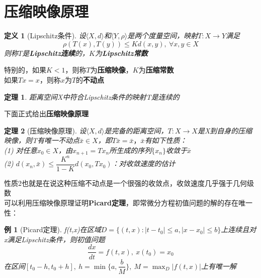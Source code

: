 \documentclass[12pt, a4paper, oneside, fontset=windows]{ctexbook}
\newtheorem{theorem}{定理}[section]
\newtheorem{definition}{定义}[section]
\newtheorem{example}{例}[section]
\begin{document}
    \section{压缩映像原理}
    \begin{definition}[Lipschitz条件]
        设$\langle X,d \rangle$和$\langle Y,\rho \rangle$是两个度量空间，映射$T:X\to Y$满足
        \[
            \rho (T(x),T(y))\le K d(x,y),\ \forall x,y\in X
        \]
        则称$T$是\textbf{Lipschitz连续}的，$K$为\textbf{Lipschitz常数}
    \end{definition}
    特别的，如果$K<1$，则称$T$为\textbf{压缩映像}，$K$为\textbf{压缩常数}\\
    如果$Tx=x$，则称$x$为$T$的\textbf{不动点}\\
    \begin{theorem}
        距离空间X中符合Lipschitz条件的映射T是连续的
    \end{theorem}
    下面正式给出{\bf 压缩映像原理}
    \begin{theorem}[压缩映像原理]
        设$\langle X,d \rangle$是完备的距离空间，$T:X\to X$是X到自身的压缩映像，则T有唯一不动点$\bar{x}\in X$，即$T\bar{x}=\bar{x}，\bar{x}$有如下性质：\\
        (1) 对任意$x_0\in X$，由$x_{n+1}=Tx_n$所生成的序列$\{x_n\}$收敛于$\bar{x}$\\
        (2) $d(x_n,\bar{x})\le \dfrac{K^n}{1-K}d(x_0,Tx_0)$：对收敛速度的估计
    \end{theorem}
    性质2也就是在说这种压缩不动点是一个很强的收敛点，收敛速度几乎强于几何级数\\
    可以利用压缩映像原理证明{\bf Picard定理}，即常微分方程初值问题的解的存在唯一性：\\
    \begin{example}[Picard定理]
        f(t,x)在区域$D=\{(t,x):|t-t_0|\le a,|x-x_0|\le b\}$上连续且对x满足Lipschitz条件，则初值问题
        \[\dfrac{dx}{dt}=f(t,x),\ x(t_0)=x_0\]
        在区间$[t_0-h,t_0+h],\ h=\min\{a,\dfrac{b}{M}\},\ M=\max_{D}|f(t,x)|$上有唯一解
    \end{example}
\end{document}
